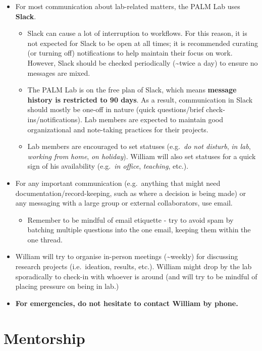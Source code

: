 \documentclass[
]{book}
\providecommand{\tightlist}{%
  \setlength{\itemsep}{0pt}\setlength{\parskip}{0pt}}
\begin{document}
\begin{itemize}
\tightlist
\item
  For most communication about lab-related matters, the PALM Lab uses \textbf{Slack}.

  \begin{itemize}
  \tightlist
  \item
    Slack can cause a lot of interruption to workflows. For this reason, it is not expected for Slack to be open at all times; it is recommended curating (or turning off) notifications to help maintain their focus on work. However, Slack should be checked periodically (\textasciitilde twice a day) to ensure no messages are mixed.
  \item
    The PALM Lab is on the free plan of Slack, which means \textbf{message history is restricted to 90 days}. As a result, communication in Slack should mostly be one-off in nature (quick questions/brief check-ins/notifications). Lab members are expected to maintain good organizational and note-taking practices for their projects.
  \item
    Lab members are encouraged to set statuses (e.g.~\emph{do not disturb}, \emph{in lab}, \emph{working from home}, \emph{on holiday}). William will also set statuses for a quick sign of his availability (e.g.~\emph{in office}, \emph{teaching}, etc.).
  \end{itemize}
\item
  For any important communication (e.g.~anything that might need documentation/record-keeping, such as where a decision is being made) or any messaging with a large group or external collaborators, use email.

  \begin{itemize}
  \tightlist
  \item
    Remember to be mindful of email etiquette - try to avoid spam by batching multiple questions into the one email, keeping them within the one thread.
  \end{itemize}
\item
  William will try to organise in-person meetings (\textasciitilde weekly) for discussing research projects (i.e.~ideation, results, etc.). William might drop by the lab sporadically to check-in with whoever is around (and will try to be mindful of placing pressure on being in lab.)
\item
  \textbf{For emergencies, do not hesitate to contact William by phone.}
\end{itemize}

\hypertarget{lab-mentorship}{%
\section{Mentorship}\label{lab-mentorship}}
\end{document}
